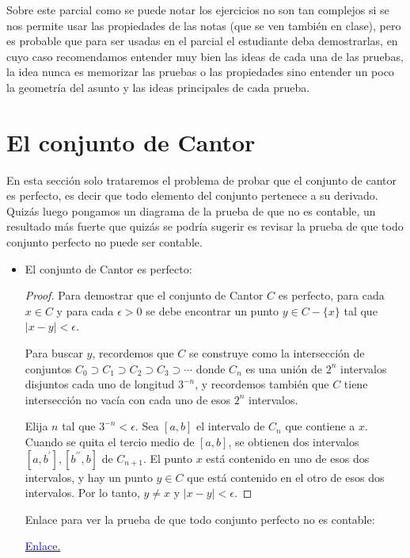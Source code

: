 \begin{note}
Sobre este parcial como se puede notar los ejercicios no son tan complejos si se nos permite usar las propiedades de las notas (que se ven también en clase), pero es probable que para ser usadas en el parcial el estudiante deba demostrarlas, en cuyo caso recomendamos entender muy bien las ideas de cada una de las pruebas, la idea nunca es memorizar las pruebas o las propiedades sino entender un poco la geometría del asunto y las ideas principales de cada prueba.
\end{note}

\section{El conjunto de Cantor }

\begin{note}
En esta sección solo trataremos el problema de probar que el conjunto de cantor es perfecto, es decir que todo elemento del conjunto pertenece a su derivado. Quizás luego pongamos un diagrama de la prueba de que no es contable, un resultado más fuerte que quizás se podría sugerir es revisar la prueba de que todo conjunto perfecto no puede ser contable.
\end{note}

\begin{itemize}[leftmargin=*]

\item El conjunto de Cantor es perfecto:\\


\begin{proof}
Para demostrar que el conjunto de Cantor $C$ es perfecto, para cada $x \in C$ y para cada $\epsilon>0$ se debe encontrar un punto $y \in C-\{x\}$ tal que $|x-y|<\epsilon$.

Para buscar $y$, recordemos que $C$ se construye como la intersección de conjuntos $C_0 \supset C_1 \supset C_2 \supset C_3 \supset \cdots$ donde $C_n$ es una unión de $2^n$ intervalos disjuntos cada uno de longitud $3^{-n}$, y recordemos también que $C$ tiene intersección no vacía con cada uno de esos $2^n$ intervalos.

Elija $n$ tal que $3^{-n}<\epsilon$.
Sea $[a, b]$ el intervalo de $C_n$ que contiene a $x$.
Cuando se quita el tercio medio de $[a, b]$, se obtienen dos intervalos $\left[a, b^{\prime}\right],\left[b^{\prime \prime}, b\right]$ de $C_{n+1}$. El punto $x$ está contenido en uno de esos dos intervalos, y hay un punto $y \in C$ que está contenido en el otro de esos dos intervalos. Por lo tanto, $y \neq x$ y $|x-y|<\epsilon$.
\end{proof}

\begin{note}
        Enlace para ver la prueba de que todo conjunto perfecto no es contable: 

        \href{https://math.stackexchange.com/questions/201922/proof-that-a-perfect-set-is-uncountable}{\textcolor{blue}{Enlace.}} 
\end{note}

        
\end{itemize}

